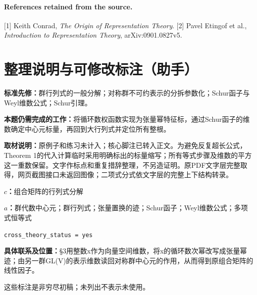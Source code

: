 \documentclass[UTF8,11pt,a4paper]{ctexart}
\theoremstyle{definition}\newtheorem*{definition}{Definition}
\theoremstyle{remark}\newtheorem*{remark}{Remark}
\begin{document}
\paragraph{References retained from the source.}
[1] Keith Conrad, \emph{The Origin of Representation Theory}.
[2] Pavel Etingof et al., \emph{Introduction to Representation Theory}, arXiv:0901.0827v5.

\section*{整理说明与可修改标注（助手）}
\textbf{标准先修：}群行列式的一般分解；对称群不可约表示的分拆参数化；Schur函子与Weyl维数公式；Schur引理。

\textbf{本题仍需完成的工作：}将循环数权函数实现为张量幂特征标，通过Schur函子的维数确定中心元标量，再回到大行列式并定位所有整根。

\textbf{取材说明：}原例子和练习未计入；核心脚注已转入正文。为避免反复超长公式，Theorem 1的代入计算临时采用明确标出的标量缩写；所有等式步骤及维数的平方这一重数保留。文字作标点和重复措辞整理，不另造证明。原PDF文字层完整取得，网页截图接口未返回图像；二项式分式依文字层的完整上下结构转录。

\textbf{$c$：}组合矩阵的行列式分解

\textbf{$a$：}群代数中心元；群行列式；张量置换的迹；Schur函子；Weyl维数公式；多项式恒等式

\texttt{cross\_theory\_status = yes}

\textbf{具体联系及位置：}§3用整数x作为向量空间维数，将x的循环数次幂改写成张量幂迹；由另一群GL(V)的表示维数读回对称群中心元的作用，从而得到原组合矩阵的线性因子。

这些标注是非穷尽初稿；未列出不表示未使用。
\end{document}
